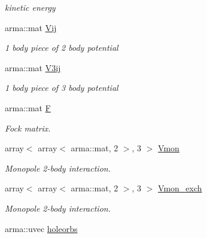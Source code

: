 \begin{DoxyCompactItemize}
\begin{DoxyCompactList}\small\item\em kinetic energy \end{DoxyCompactList}\item 
\hypertarget{classHartreeFock_ae823da58505b21231d092b3ef7cec3bf}{arma\-::mat \hyperlink{classHartreeFock_ae823da58505b21231d092b3ef7cec3bf}{Vij}}\label{classHartreeFock_ae823da58505b21231d092b3ef7cec3bf}

\begin{DoxyCompactList}\small\item\em 1 body piece of 2 body potential \end{DoxyCompactList}\item 
\hypertarget{classHartreeFock_a25a0f38a655064375765f74182ce9334}{arma\-::mat \hyperlink{classHartreeFock_a25a0f38a655064375765f74182ce9334}{V3ij}}\label{classHartreeFock_a25a0f38a655064375765f74182ce9334}

\begin{DoxyCompactList}\small\item\em 1 body piece of 3 body potential \end{DoxyCompactList}\item 
\hypertarget{classHartreeFock_a45136295f4834a9f692f262eee75672a}{arma\-::mat \hyperlink{classHartreeFock_a45136295f4834a9f692f262eee75672a}{F}}\label{classHartreeFock_a45136295f4834a9f692f262eee75672a}

\begin{DoxyCompactList}\small\item\em Fock matrix. \end{DoxyCompactList}\item 
\hypertarget{classHartreeFock_a2824bb161e6889684e0f54e5bc11e37e}{array$<$ array$<$ arma\-::mat, 2 $>$, 3 $>$ \hyperlink{classHartreeFock_a2824bb161e6889684e0f54e5bc11e37e}{Vmon}}\label{classHartreeFock_a2824bb161e6889684e0f54e5bc11e37e}

\begin{DoxyCompactList}\small\item\em Monopole 2-\/body interaction. \end{DoxyCompactList}\item 
\hypertarget{classHartreeFock_a3127c115a3acd7438fb06040be155736}{array$<$ array$<$ arma\-::mat, 2 $>$, 3 $>$ \hyperlink{classHartreeFock_a3127c115a3acd7438fb06040be155736}{Vmon\-\_\-exch}}\label{classHartreeFock_a3127c115a3acd7438fb06040be155736}

\begin{DoxyCompactList}\small\item\em Monopole 2-\/body interaction. \end{DoxyCompactList}\item 
\hypertarget{classHartreeFock_a9700861effb1cb3739240b76ed519141}{arma\-::uvec \hyperlink{classHartreeFock_a9700861effb1cb3739240b76ed519141}{holeorbs}}\label{classHartreeFock_a9700861effb1cb3739240b76ed519141}


\end{DoxyCompactItemize}
